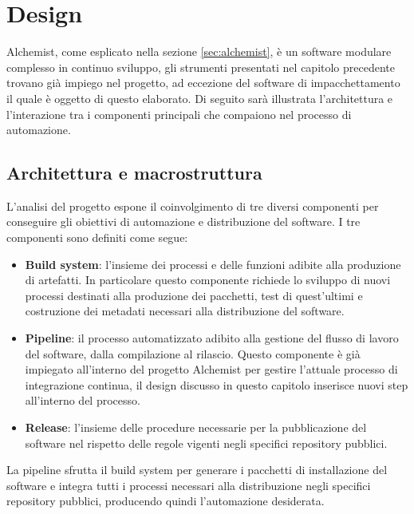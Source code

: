 
\chapter{Design}
Alchemist, come esplicato nella sezione \ref{sec:alchemist}, è un software modulare complesso in continuo sviluppo, gli strumenti presentati nel capitolo precedente trovano già impiego nel progetto, ad eccezione del software di impacchettamento il quale è oggetto di questo elaborato. Di seguito sarà illustrata l'architettura e l'interazione tra i componenti principali che compaiono nel processo di automazione.

\section{Architettura e macrostruttura}
L'analisi del progetto espone il coinvolgimento di tre diversi componenti per conseguire gli obiettivi di automazione e distribuzione del software. I tre componenti sono definiti come segue: 
\begin{itemize}
	\item \textbf{Build system}: l'insieme dei processi e delle funzioni adibite alla produzione di artefatti. In particolare questo componente richiede lo sviluppo di nuovi processi destinati alla produzione dei pacchetti, test di quest'ultimi e costruzione dei metadati necessari alla distribuzione del software.
	\item \textbf{Pipeline}: il processo automatizzato adibito alla gestione del flusso di lavoro del software, dalla compilazione al rilascio. Questo componente è già impiegato all'interno del progetto Alchemist per gestire l'attuale processo di integrazione continua, il design discusso in questo capitolo inserisce nuovi step all'interno del processo.
	\item \textbf{Release}: l'insieme delle procedure necessarie per la pubblicazione del software nel rispetto delle regole vigenti negli specifici repository pubblici.
\end{itemize}
La pipeline sfrutta il build system per generare i pacchetti di installazione del software e integra tutti i processi necessari alla distribuzione negli specifici repository pubblici, producendo quindi l'automazione desiderata.

